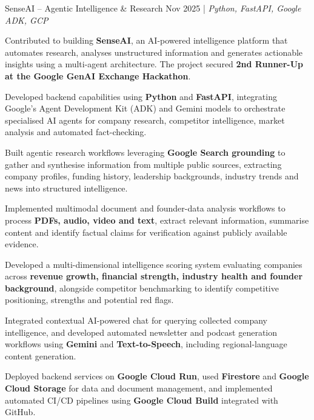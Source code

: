 
\resumeSubheadings
{SenseAI -- Agentic Intelligence \& Research }
{Nov 2025}
{}{}{| \textit{Python, FastAPI, Google ADK, GCP}}
\resumeItemListStart
\item Contributed to building \textbf{SenseAI}, an AI-powered intelligence platform that automates research, analyses unstructured information and generates actionable insights using a multi-agent architecture. The project secured \textbf{2nd Runner-Up at the Google GenAI Exchange Hackathon}.
\item Developed backend capabilities using \textbf{Python} and \textbf{FastAPI}, integrating Google's Agent Development Kit (ADK) and Gemini models to orchestrate specialised AI agents for company research, competitor intelligence, market analysis and automated fact-checking.
\item Built agentic research workflows leveraging \textbf{Google Search grounding} to gather and synthesise information from multiple public sources, extracting company profiles, funding history, leadership backgrounds, industry trends and news into structured intelligence.
\item Implemented multimodal document and founder-data analysis workflows to process \textbf{PDFs, audio, video and text}, extract relevant information, summarise content and identify factual claims for verification against publicly available evidence.
\item Developed a multi-dimensional intelligence scoring system evaluating companies across \textbf{revenue growth, financial strength, industry health and founder background}, alongside competitor benchmarking to identify competitive positioning, strengths and potential red flags.
\item Integrated contextual AI-powered chat for querying collected company intelligence, and developed automated newsletter and podcast generation workflows using \textbf{Gemini} and \textbf{Text-to-Speech}, including regional-language content generation.
\item Deployed backend services on \textbf{Google Cloud Run}, used \textbf{Firestore} and \textbf{Google Cloud Storage} for data and document management, and implemented automated CI/CD pipelines using \textbf{Google Cloud Build} integrated with GitHub.
\resumeItemListEnd
